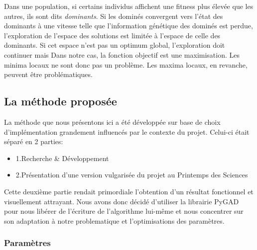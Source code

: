 \documentclass[journal, a4paper]{IEEEtran}
\begin{document}
	Dans une population, si certains individus affichent une fitness
	plus élevée que les autres, ils sont dits \emph{dominants}.
	Si les dominés convergent vers l'état des dominants à une vitesse
	telle que l'information génétique des dominés est perdue,
	l'exploration de l'espace des solutions est limitée à l'espace
	de celle des dominants. Si cet espace n'est pas un optimum global,
	l'exploration doit continuer mais
	Dans notre cas, la fonction objectif est une maximisation.
	Les minima locaux ne sont donc pas un problème.
	Les maxima locaux, en revanche, peuvent être problématiques.

	\subsection{La méthode proposée}\label{subsec:la-methode-proposee}
	La méthode que nous présentons ici a été développée sur base de
	choix d'implémentation grandement influencés par le contexte du
	projet.
	Celui-ci était séparé en 2 parties:
	\begin{itemize}
		\item 1.Recherche \& Développement
		\item 2.Présentation d'une version vulgarisée du projet au
		Printemps des Sciences
	\end{itemize}
	Cette deuxième partie rendait primordiale l'obtention d'un
	résultat
	fonctionnel et visuellement attrayant.
	Nous avons donc décidé d'utiliser la librairie PyGAD\cite{pygad}
	pour nous libérer de l'écriture de l'algorithme lui-même et nous
	concentrer sur son adaptation à notre problematique et
	l'optimisations des paramètres.

	\subsubsection{Paramètres}
	\newline
%
%
%
%
\end{document}
